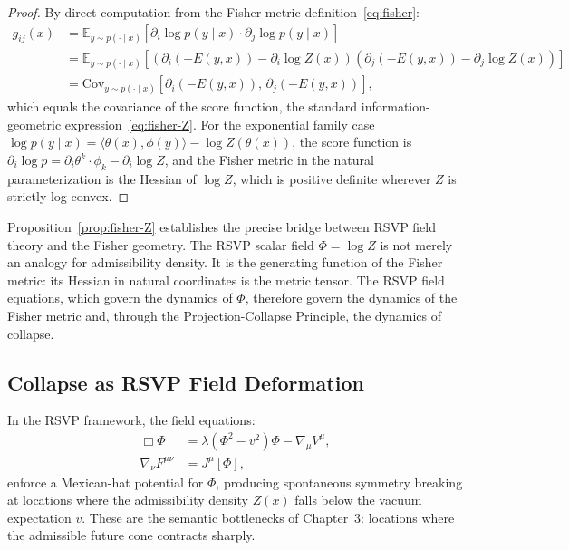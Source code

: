 \documentclass[12pt, oneside]{book}
\theoremstyle{plain-flyxion}
\theoremstyle{definition-flyxion}
\begin{document}
\begin{proof}
By direct computation from the Fisher metric definition~\eqref{eq:fisher}:
\begin{align*}
g_{ij}(x)
&= \mathbb{E}_{y \sim p(\cdot\mid x)}\!\left[\partial_i \log p(y\mid x)\cdot
   \partial_j \log p(y\mid x)\right] \\
&= \mathbb{E}_{y \sim p(\cdot\mid x)}\!\left[
   \left(\partial_i(-E(y,x)) - \partial_i \log Z(x)\right)
   \left(\partial_j(-E(y,x)) - \partial_j \log Z(x)\right)\right] \\
&= \mathrm{Cov}_{y \sim p(\cdot\mid x)}\!\left[\partial_i(-E(y,x)),\, \partial_j(-E(y,x))\right],
\end{align*}
which equals the covariance of the score function, the standard information-geometric
expression~\eqref{eq:fisher-Z}. For the exponential family case $\log p(y\mid x) =
\langle\theta(x), \phi(y)\rangle - \log Z(\theta(x))$, the score function is
$\partial_i \log p = \partial_i\theta^k \cdot \phi_k - \partial_i \log Z$, and the
Fisher metric in the natural parameterization is the Hessian of $\log Z$, which is
positive definite wherever $Z$ is strictly log-convex.
\end{proof}

Proposition~\ref{prop:fisher-Z} establishes the precise bridge between RSVP field theory
and the Fisher geometry. The RSVP scalar field $\Phi = \log Z$ is not merely an analogy
for admissibility density. It is the generating function of the Fisher metric: its Hessian
in natural coordinates is the metric tensor. The RSVP field equations, which govern the
dynamics of $\Phi$, therefore govern the dynamics of the Fisher metric and, through the
Projection-Collapse Principle, the dynamics of collapse.

\subsection*{Collapse as RSVP Field Deformation}

In the RSVP framework, the field equations:
\begin{align}
\Box\Phi &= \lambda(\Phi^2 - v^2)\Phi - \nabla_\mu V^\mu, \label{eq:rsvp-scalar}\\
\nabla_\nu F^{\mu\nu} &= J^\mu[\Phi], \label{eq:rsvp-vector}
\end{align}
enforce a Mexican-hat potential for $\Phi$, producing spontaneous symmetry breaking at
locations where the admissibility density $Z(x)$ falls below the vacuum expectation $v$.
These are the semantic bottlenecks of Chapter~3: locations where the admissible future
cone contracts sharply.
\end{document}

